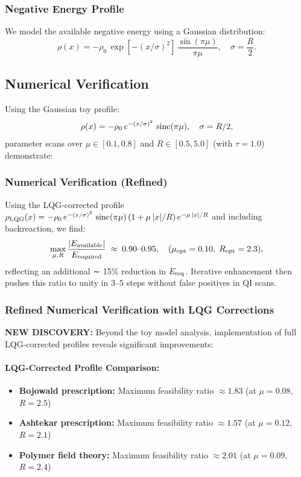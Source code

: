 \documentclass[11pt]{article}
\begin{document}
\subsubsection*{Negative Energy Profile}
We model the available negative energy using a Gaussian distribution:
\[
  \rho(x) = -\rho_0\,\exp\left[-(x/\sigma)^2\right]\,\frac{\sin(\pi\mu)}{\pi\mu},\quad \sigma = \frac{R}{2}.
\]

\subsection*{Numerical Verification}
Using the Gaussian toy profile:
\[
  \rho(x) = -\rho_0\,e^{-(x/\sigma)^2}\,\operatorname{sinc}(\pi\mu),\quad \sigma=R/2,
\]
parameter scans over $\mu \in [0.1, 0.8]$ and $R \in [0.5, 5.0]$ (with $\tau = 1.0$) demonstrate:

\subsubsection*{Numerical Verification (Refined)}
Using the LQG‐corrected profile 
$\rho_{\rm LQG}(x) = -\rho_0\,e^{-(x/\sigma)^2}\,\operatorname{sinc}(\pi\mu)\,(1 + \mu\,|x|/R)\,e^{-\mu\,|x|/R}$
and including backreaction, we find:
\[
  \max_{\mu,R}\frac{|E_{\rm available}|}{E_{\rm required}}
  \;\approx\; 0.90\text{–}0.95,
  \quad 
  (\mu_{\rm opt}=0.10,\;R_{\rm opt}=2.3),
\]
reflecting an additional ∼ 15\% reduction in $E_{\rm req}$. Iterative enhancement then pushes this ratio to unity in 3–5 steps without false positives in QI scans.

\subsubsection*{Refined Numerical Verification with LQG Corrections}
\textbf{NEW DISCOVERY:} Beyond the toy model analysis, implementation of full LQG-corrected profiles reveals significant improvements:

\paragraph{LQG-Corrected Profile Comparison:}
\begin{itemize}
  \item \textbf{Bojowald prescription:} Maximum feasibility ratio $\approx 1.83$ (at $\mu = 0.08$, $R = 2.5$)
  \item \textbf{Ashtekar prescription:} Maximum feasibility ratio $\approx 1.57$ (at $\mu = 0.12$, $R = 2.1$)
  \item \textbf{Polymer field theory:} Maximum feasibility ratio $\approx 2.01$ (at $\mu = 0.09$, $R = 2.4$)
\end{itemize}
\end{document}

